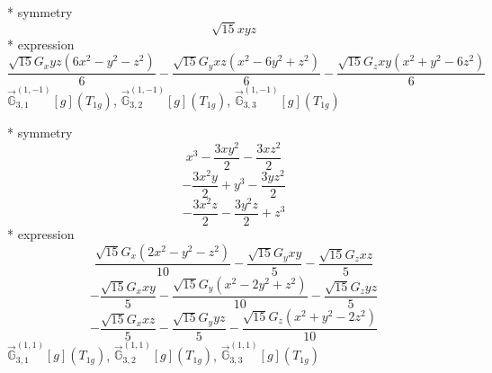 \documentclass[fleqn,8pt]{jsarticle}
\begin{document}
\noindent\quad ** symmetry
\begin{dmath*}
\sqrt{15} x y z
\end{dmath*}
\noindent\quad ** expression
\begin{dmath*}
\frac{\sqrt{15} G_{x} y z \left(6 x^{2} - y^{2} - z^{2}\right)}{6} - \frac{\sqrt{15} G_{y} x z \left(x^{2} - 6 y^{2} + z^{2}\right)}{6} - \frac{\sqrt{15} G_{z} x y \left(x^{2} + y^{2} - 6 z^{2}\right)}{6}
\end{dmath*}
\noindent\quad $\vec{\mathbb{G}}_{3,1}^{(1,-1)}[g](T_{1g})$, $\vec{\mathbb{G}}_{3,2}^{(1,-1)}[g](T_{1g})$, $\vec{\mathbb{G}}_{3,3}^{(1,-1)}[g](T_{1g})$

\noindent\quad ** symmetry
\begin{dmath*}
x^{3} - \frac{3 x y^{2}}{2} - \frac{3 x z^{2}}{2}
\end{dmath*}
\begin{dmath*}
- \frac{3 x^{2} y}{2} + y^{3} - \frac{3 y z^{2}}{2}
\end{dmath*}
\begin{dmath*}
- \frac{3 x^{2} z}{2} - \frac{3 y^{2} z}{2} + z^{3}
\end{dmath*}
\noindent\quad ** expression
\begin{dmath*}
\frac{\sqrt{15} G_{x} \left(2 x^{2} - y^{2} - z^{2}\right)}{10} - \frac{\sqrt{15} G_{y} x y}{5} - \frac{\sqrt{15} G_{z} x z}{5}
\end{dmath*}
\begin{dmath*}
- \frac{\sqrt{15} G_{x} x y}{5} - \frac{\sqrt{15} G_{y} \left(x^{2} - 2 y^{2} + z^{2}\right)}{10} - \frac{\sqrt{15} G_{z} y z}{5}
\end{dmath*}
\begin{dmath*}
- \frac{\sqrt{15} G_{x} x z}{5} - \frac{\sqrt{15} G_{y} y z}{5} - \frac{\sqrt{15} G_{z} \left(x^{2} + y^{2} - 2 z^{2}\right)}{10}
\end{dmath*}
\noindent\quad $\vec{\mathbb{G}}_{3,1}^{(1,1)}[g](T_{1g})$, $\vec{\mathbb{G}}_{3,2}^{(1,1)}[g](T_{1g})$, $\vec{\mathbb{G}}_{3,3}^{(1,1)}[g](T_{1g})$
\end{document}
